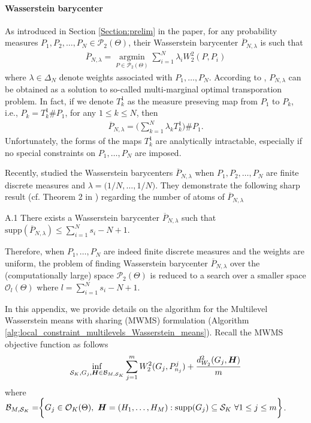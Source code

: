 \paragraph{Wasserstein barycenter} \label{Section:Append_Wasserstein_barycenter}
As introduced in Section \ref{Section:prelim} in the paper, 
for any probability measures $P_{1}, P_{2}, \ldots, P_{N} \in \mathcal{P}_{2}(\Theta)$, their Wasserstein barycenter $\overline{P}_{N,\lambda}$ is such that
\begin{eqnarray}
\overline{P}_{N,\lambda}=\mathop {\arg \min}\limits_{P \in \mathcal{P}_{2}(\Theta)}{\sum \limits_{i=1}^{N}{\lambda_{i}W_{2}^{2}(P,P_{i})}} \nonumber
\end{eqnarray} 
where $\lambda \in \Delta_{N}$ denote weights associated with $P_{1},\ldots,P_{N}$. 
According to \citep{Carlier-2011}, $P_{N,\lambda}$ can be obtained as a solution to 
so-called multi-marginal optimal transporation problem. In fact, if we denote $T_{k}^{1}$ as 
the measure preseving map from $P_{1}$ to $P_{k}$, i.e., 
$P_{k}=T_{k}^{1} \# P_{1}$, for any $1 \leq k \leq N$, then \begin{eqnarray}
\overline{P}_{N,\lambda}=\biggr(\sum \limits_{k=1}^{N}{\lambda_{k}T_{k}^{1}}\biggr)\# P_{1}. \nonumber
\end{eqnarray}
Unfortunately, the forms of the maps $T_{k}^{1}$ are analytically intractable, especially 
if no special constraints on $P_{1}, \ldots, P_{N}$ are imposed.

Recently, \citep{Anderes-2015} studied the Wasserstein barycenters $\overline{P}_{N,
\lambda}$ when $P_{1}, P_{2}, \ldots, P_{N}$ are finite discrete measures and $\lambda=
\biggr(1/N,\ldots,1/N\biggr)$. They demonstrate the following sharp result (cf. Theorem 2 
in \citep{Anderes-2015}) regarding the number of atoms of $\overline{P}_{N,\lambda}$
\begin{customthm}{A.1} \label{theorem:upperbound_barycenter} There exists a Wasserstein 
barycenter $\overline{P}_{N,\lambda}$ such that $\text{supp}(\overline{P}_{N,\lambda}) \leq \sum \limits_{i=1}^{N}{s_{i}}-N+1$.
\end{customthm}
Therefore, when $P_{1},\ldots, P_{N}$ are indeed finite discrete measures and the weights 
are uniform, the problem of finding Wasserstein barycenter $\overline{P}_{N,\lambda}$ over 
the (computationally large) space $\mathcal{P}_{2}(\Theta)$ is 
reduced to a search over a smaller
space $\mathcal{O}_{l}(\Theta)$ where $l=\sum \limits_{i=1}^{N}{s_{i}-N+1}$.

In this appendix, we provide details on the algorithm for the Multilevel Wasserstein means with sharing (MWMS) 
formulation (Algorithm \ref{alg:local_constraint_multilevels_Wasserstein_means}). Recall the MWMS objective function as follows
\begin{eqnarray}
\mathop {\inf }\limits_{\mathcal{S}_{K},G_{j} , \boldsymbol{H} \in \mathcal{B}_{M,\mathcal{S}_{K}}}{\mathop {\sum }\limits_{j=1}^{m}{W_{2}^{2}(G_{j},P_{n_{j}}^{j})}+\dfrac{d_{W_{2}}^{2}(G_{j},\boldsymbol{H})}{m}} \nonumber
\end{eqnarray}
where  $\mathcal{B}_{M,\mathcal{S}_{K}}=\biggr\{G_{j} \in \mathcal{O}_{K}(\Theta), \ \boldsymbol{H}=(H_{1},\ldots,H_{M}): 
\text{supp}(G_{j})\subseteq \mathcal{S}_{K}\ \forall 1 \leq j \leq m \biggr\}$. 

